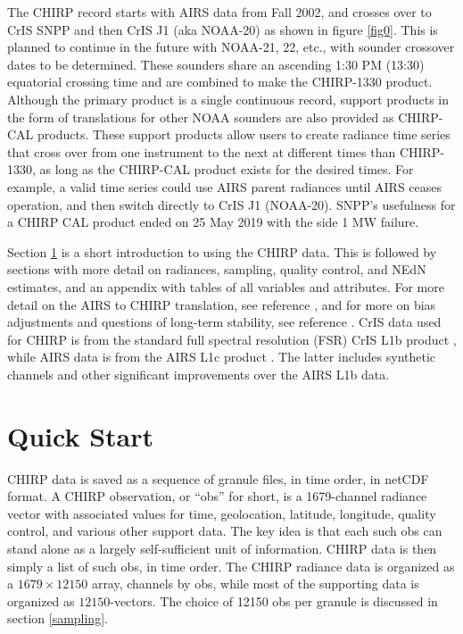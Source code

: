 \documentclass[11pt]{article}
\begin{document}
The CHIRP record starts with AIRS data from Fall 2002, and crosses
over to CrIS SNPP and then CrIS J1 (aka NOAA-20) as shown in figure
\ref{fig0}.  This is planned to continue in the future with NOAA-21,
22, etc., with sounder crossover dates to be determined.  These
sounders share an ascending 1:30 PM (13:30) equatorial crossing time
and are combined to make the CHIRP-1330 product.  Although the
primary product is a single continuous record, support products in
the form of translations for other NOAA sounders are also provided
as CHIRP-CAL products.  These support products allow users to create
radiance time series that cross over from one instrument to the next
at different times than CHIRP-1330, as long as the CHIRP-CAL product
exists for the desired times.  For example, a valid time series
could use AIRS parent radiances until AIRS ceases operation, and
then switch directly to CrIS J1 (NOAA-20).  SNPP's usefulness for a
CHIRP CAL product ended on 25 May 2019 with the side 1 MW failure.

Section \ref{format} is a short introduction to using the CHIRP data.
This is followed by sections with more detail on radiances, sampling,
quality control, and NEdN estimates, and an appendix with tables of
all variables and attributes.  For more detail on the AIRS to CHIRP
translation, see reference \cite{mott2018}, and for more on bias
adjustments and questions of long-term stability, see reference
\cite{strow2021a}.
CrIS data used for CHIRP is from the standard full spectral
resolution (FSR) CrIS L1b product \cite{cris:user}, while AIRS data
is from the AIRS L1c product \cite{a1c:user}.  The latter includes
synthetic channels and other significant improvements over the AIRS
L1b data.

\section{Quick Start}
\label{format}

CHIRP data is saved as a sequence of granule files, in time order,
in netCDF format.  A CHIRP observation, or ``obs'' for short, is a
1679-channel radiance vector with associated values for time,
geolocation, latitude, longitude, quality control, and various other
support data.  The key idea is that each such obs can stand alone as
a largely self-sufficient unit of information.  CHIRP data is then
simply a list of such obs, in time order.  The CHIRP radiance data
is organized as a $1679 \times 12150$ array, channels by obs, while
most of the supporting data is organized as $12150$-vectors.  The
choice of 12150 obs per granule is discussed in section
\ref{sampling}.
\end{document}
